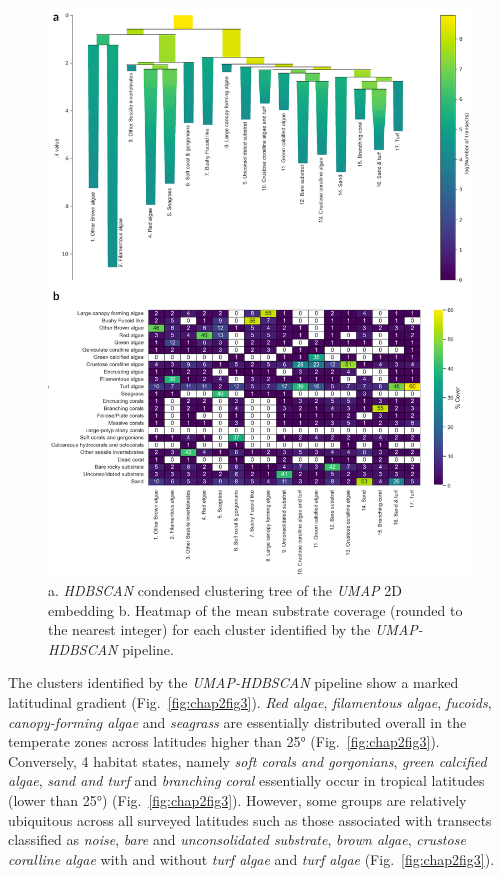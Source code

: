 \begin{refsection}
\begin{figure}
\hypertarget{fig:chap2fig2}{%
\centering
\includegraphics{03-Chapitre2/figures/fig2.png}
\caption[a. \emph{HDBSCAN} condensed clustering tree of the \emph{UMAP}
2D embedding b. Heatmap of the mean substrate coverage for each cluster identified 
by the \emph{UMAP-HDBSCAN} pipeline.]{a. \emph{HDBSCAN} condensed clustering tree of the \emph{UMAP}
2D embedding b. Heatmap of the mean substrate coverage (rounded to the
nearest integer) for each cluster identified by the \emph{UMAP-HDBSCAN}
pipeline.}\label{fig:chap2fig2}
}
\end{figure}

The clusters identified by the \emph{UMAP-HDBSCAN} pipeline show a
marked latitudinal gradient (Fig.~\ref{fig:chap2fig3}). \emph{Red
algae}, \emph{filamentous algae}, \emph{fucoids}, \emph{canopy-forming
algae} and \emph{seagrass} are essentially distributed overall in the
temperate zones across latitudes higher than 25°
(Fig.~\ref{fig:chap2fig3}). Conversely, 4 habitat states, namely
\emph{soft corals and gorgonians}, \emph{green calcified algae},
\emph{sand and turf} and \emph{branching coral} essentially occur in
tropical latitudes (lower than 25°) (Fig.~\ref{fig:chap2fig3}). However,
some groups are relatively ubiquitous across all surveyed latitudes such
as those associated with transects classified as \emph{noise},
\emph{bare} and \emph{unconsolidated substrate}, \emph{brown algae},
\emph{crustose coralline algae} with and without \emph{turf algae} and
\emph{turf algae} (Fig.~\ref{fig:chap2fig3}).


\end{refsection}
